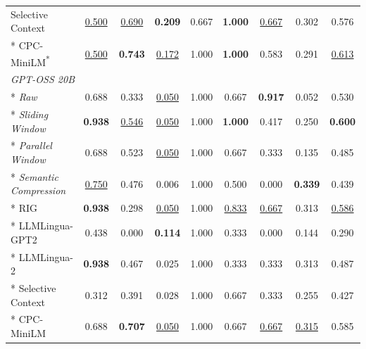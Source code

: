 {\begin{longtable}{lcc|cc|cc|c|c}
Selective Context              & \underline{0.500} & \underline{0.690} & \textbf{0.209} & 0.667 & \textbf{1.000} & \underline{0.667} & 0.302 & 0.576 \\*
CPC-MiniLM\textsuperscript{*}  & \underline{0.500} & \textbf{0.743} & \underline{0.172} & 1.000 & \textbf{1.000} & 0.583 & 0.291 & \underline{0.613} \\
\midrule
\multicolumn{9}{l}{\textit{GPT-OSS 20B}} \\*
\textit{Raw}                   & 0.688 & 0.333 & \underline{0.050} & 1.000 & 0.667 & \textbf{0.917} & 0.052 & 0.530 \\*
\textit{Sliding Window}        & \textbf{0.938} & \underline{0.546} & \underline{0.050} & 1.000 & \textbf{1.000} & 0.417 & 0.250 & \textbf{0.600} \\*
\textit{Parallel Window}       & 0.688 & 0.523 & \underline{0.050} & 1.000 & 0.667 & 0.333 & 0.135 & 0.485 \\*
\textit{Semantic Compression}  & \underline{0.750} & 0.476 & 0.006 & 1.000 & 0.500 & 0.000 & \textbf{0.339} & 0.439 \\*
RIG                            & \textbf{0.938} & 0.298 & \underline{0.050} & 1.000 & \underline{0.833} & \underline{0.667} & 0.313 & \underline{0.586} \\*
LLMLingua-GPT2                 & 0.438 & 0.000 & \textbf{0.114} & 1.000 & 0.333 & 0.000 & 0.144 & 0.290 \\*
LLMLingua-2                    & \textbf{0.938} & 0.467 & 0.025 & 1.000 & 0.333 & 0.333 & 0.313 & 0.487 \\*
Selective Context              & 0.312 & 0.391 & 0.028 & 1.000 & 0.667 & 0.333 & 0.255 & 0.427 \\*
CPC-MiniLM                     & 0.688 & \textbf{0.707} & \underline{0.050} & 1.000 & 0.667 & \underline{0.667} & \underline{0.315} & 0.585 \\
\end{longtable}
}

